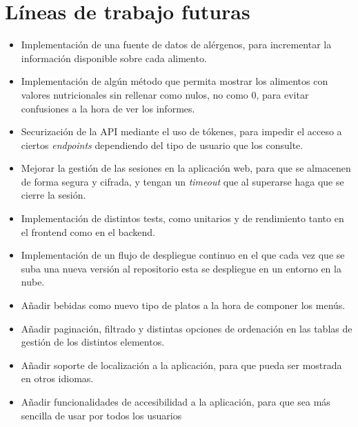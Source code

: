 \section{Líneas de trabajo futuras}
\begin{itemize}
\item Implementación de una fuente de datos de alérgenos, para incrementar la información disponible sobre cada alimento.
\item Implementación de algún método que permita mostrar los alimentos con valores nutricionales sin rellenar como nulos, no como 0, para evitar confusiones a la hora de ver los informes.
\item Securización de la API mediante el uso de tókenes, para impedir el acceso a ciertos \textit{endpoints} dependiendo del tipo de usuario que los consulte.
\item Mejorar la gestión de las sesiones en la aplicación web, para que se almacenen de forma segura y cifrada, y tengan un \textit{timeout} que al superarse haga que se cierre la sesión.
\item Implementación de distintos tests, como unitarios y de rendimiento tanto en el frontend como en el backend.
\item Implementación de un flujo de despliegue continuo en el que cada vez que se suba una nueva versión al repositorio esta se despliegue en un entorno en la nube.
\item Añadir bebidas como nuevo tipo de platos a la hora de componer los menús.
\item Añadir paginación, filtrado y distintas opciones de ordenación en las tablas de gestión de los distintos elementos.
\item Añadir soporte de localización a la aplicación, para que pueda ser mostrada en otros idiomas.
\item Añadir funcionalidades de accesibilidad a la aplicación, para que sea más sencilla de usar por todos los usuarios
\end{itemize}


